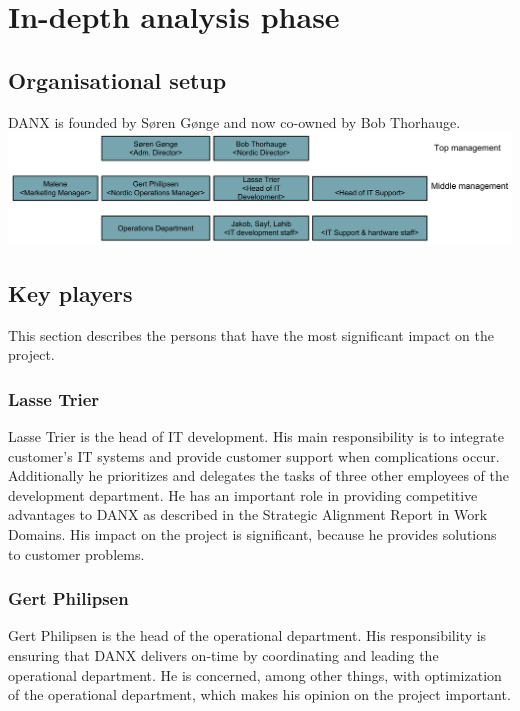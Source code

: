 \chapter{In-depth analysis phase}
\label{chap:indepthreport}
\section{Organisational setup}
DANX is founded by Søren Gønge and now co-owned by Bob Thorhauge.\cite{malene002}\\
\includegraphics[scale=0.55]{img/Organizational_Chart}

\section{Key players}
This section describes the persons that have the most significant impact on the project.

\subsection{Lasse Trier}
Lasse Trier is the head of IT development. His main responsibility is to integrate customer’s IT systems and provide customer support when complications occur.\cite{lahib003}\cite{lahib004}\\
Additionally he prioritizes and delegates the tasks of three other employees of the development department.\cite{lasse009} He has an important role in providing competitive advantages to DANX as described in the Strategic Alignment Report in Work Domains. His impact on the project is significant, because he provides solutions to customer problems.

\subsection{Gert Philipsen}
Gert Philipsen is the head of the operational department. His responsibility is ensuring that DANX delivers on-time by coordinating and leading the operational department. He is concerned, among other things, with optimization of the operational department\cite{gert015}, which makes his opinion on the project important.

